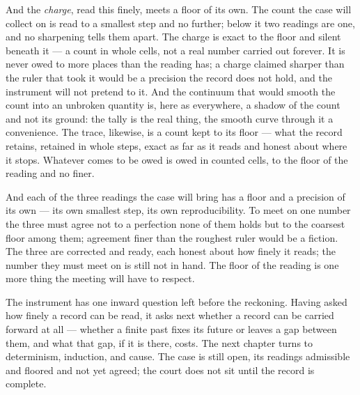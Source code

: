 And the \emph{charge}, read this finely, meets a floor of its own. The count the case will collect on is read to
a smallest step and no further; below it two readings are one, and no sharpening tells them apart. The charge is
exact to the floor and silent beneath it --- a count in whole cells, not a real number carried out forever. It
is never owed to more places than the reading has; a charge claimed sharper than the ruler that took it would be
a precision the record does not hold, and the instrument will not pretend to it. And
the continuum that would smooth the count into an unbroken quantity is, here as everywhere, a shadow of the
count and not its ground: the tally is the real thing, the smooth curve through it a convenience. The trace,
likewise, is a count kept to its floor --- what the record retains, retained in whole steps, exact as far as it
reads and honest about where it stops. Whatever comes to be owed is owed in counted cells, to the floor of the
reading and no finer.

And each of the three readings the case will bring has a floor and a precision of its own --- its own smallest
step, its own reproducibility. To meet on one number the three must agree not to a perfection none of them holds
but to the coarsest floor among them; agreement finer than the roughest ruler would be a fiction. The three are
corrected and ready, each honest about how finely it reads; the number they must meet on is still not in hand. The
floor of the reading is one more thing the meeting will have to respect.

The instrument has one inward question left before the reckoning. Having asked how finely a record can be read, it
asks next whether a record can be carried forward at all --- whether a finite past fixes its future or leaves a
gap between them, and what that gap, if it is there, costs. The next chapter turns to determinism, induction,
and cause. The case is still open, its readings admissible and floored and not yet agreed; the court does not
sit until the record is complete.

